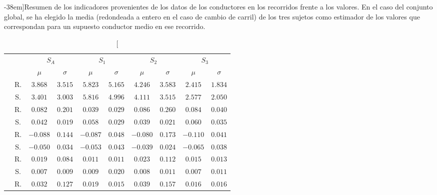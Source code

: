 \begin{table*}[!b]
	\centering
	\caption[Indicadores reales frente a indicadores capturados en simulación][-38em]{Resumen de los indicadores provenientes de los datos de los conductores en los recorridos frente a los valores. En el caso del conjunto global, se ha elegido la media (redondeada a entero en el caso de cambio de carril) de los tres sujetos como estimador de los valores que correspondan para un supuesto conductor medio en ese recorrido.}
	\label{tbl:global-comparison-indicators}
	\begin{tabular}{cccccccccc}
		\toprule
		&                   & \multicolumn{2}{c}{$S_A$}    & \multicolumn{2}{c}{$S_1$}          & \multicolumn{2}{c}{$S_2$}        & \multicolumn{2}{c}{\textbf{$S_3$}}        \\
		\multicolumn{2}{l}{}                  & $\mu$     & $\sigma$ & $\mu$    & $\sigma$ & $\mu$     & $\sigma$  & $\mu$    & $\sigma$ \\
		\midrule
		\rowcolor{black!20} \cellcolor{white} \multirow{2}{*}{\textbf{$V$}}   & R. & $3.868$  & $3.515$  & $5.823$  & $5.165$  & $4.246$  & $3.583$  & $2.415$  & $1.834$  \\
		& S. & $3.401$  & $3.003$  & $5.816$  & $4.996$  & $4.111$  & $3.515$  & $2.577$  & $2.050$  \\
		\rowcolor{black!20} \cellcolor{white} \multirow{2}{*}{\textbf{$AP$}}  & R. & $0.082$  & $0.201$  & $0.039$  & $0.029$  & $0.086$  & $0.260$  & $0.084$  & $0.040$  \\
		& S. & $0.042$  & $0.019$  & $0.058$  & $0.029$  & $0.039$  & $0.021$  & $0.060$  & $0.035$  \\
		\rowcolor{black!20} \cellcolor{white} \multirow{2}{*}{\textbf{$AN$}}  & R. & $-0.088$ & $0.144$  & $-0.087$ & $0.048$  & $-0.080$ & $0.173$  & $-0.110$ & $0.041$  \\
		& S. & $-0.050$ & $0.034$  & $-0.053$ & $0.043$  & $-0.039$ & $0.024$  & $-0.065$ & $0.038$  \\
		\rowcolor{black!20} \cellcolor{white} \multirow{2}{*}{\textbf{$JIM$}} & R. & $0.019$  & $0.084$  & $0.011$  & $0.011$  & $0.023$  & $0.112$  & $0.015$  & $0.013$  \\
		& S. & $0.007$  & $0.009$  & $0.009$  & $0.020$  & $0.008$  & $0.011$  & $0.007$  & $0.011$  \\
		\rowcolor{black!20} \cellcolor{white} \multirow{2}{*}{\textbf{$JLC$}} & R. & $0.032$  & $0.127$  & $0.019$  & $0.015$  & $0.039$  & $0.157$  & $0.016$  & $0.016$  \\

\end{tabular}
\end{table*}
